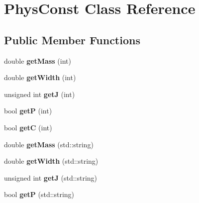 \hypertarget{class_phys_const}{\section{Phys\-Const Class Reference}
\label{class_phys_const}
}
\subsection*{Public Member Functions}
\begin{DoxyCompactItemize}
\item 
\hypertarget{class_phys_const_a27752d4b11d0baaee2be3f81af24886e}{double {\bfseries get\-Mass} (int)}\label{class_phys_const_a27752d4b11d0baaee2be3f81af24886e}

\item 
\hypertarget{class_phys_const_a6497e0d2a198c37543ba681211582042}{double {\bfseries get\-Width} (int)}\label{class_phys_const_a6497e0d2a198c37543ba681211582042}

\item 
\hypertarget{class_phys_const_a996cd91d3d83ed18a5b703b06b561d48}{unsigned int {\bfseries get\-J} (int)}\label{class_phys_const_a996cd91d3d83ed18a5b703b06b561d48}

\item 
\hypertarget{class_phys_const_adde5d55a9bdc58f010f6d2ccce2e2f8b}{bool {\bfseries get\-P} (int)}\label{class_phys_const_adde5d55a9bdc58f010f6d2ccce2e2f8b}

\item 
\hypertarget{class_phys_const_a4a01491f0c11364cdcc14183bb09ec3b}{bool {\bfseries get\-C} (int)}\label{class_phys_const_a4a01491f0c11364cdcc14183bb09ec3b}

\item 
\hypertarget{class_phys_const_a4600a91a8dd57bc18f544ae46975452c}{double {\bfseries get\-Mass} (std\-::string)}\label{class_phys_const_a4600a91a8dd57bc18f544ae46975452c}

\item 
\hypertarget{class_phys_const_a0698813a95fb1f19ff6f970983d3ccc0}{double {\bfseries get\-Width} (std\-::string)}\label{class_phys_const_a0698813a95fb1f19ff6f970983d3ccc0}

\item 
\hypertarget{class_phys_const_af346e4b5d064095800b079d9a01d1af2}{unsigned int {\bfseries get\-J} (std\-::string)}\label{class_phys_const_af346e4b5d064095800b079d9a01d1af2}

\item 
\hypertarget{class_phys_const_ad3fff22b20d33cf0447117f987b2ef31}{bool {\bfseries get\-P} (std\-::string)}\label{class_phys_const_ad3fff22b20d33cf0447117f987b2ef31}


\end{DoxyCompactItemize}
